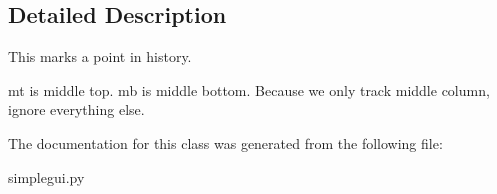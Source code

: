 \subsection{Detailed Description}
This marks a point in history. 

mt is middle top. mb is middle bottom. Because we only track middle column, ignore everything else. 

The documentation for this class was generated from the following file\-:\begin{DoxyCompactItemize}
\item 
simplegui.\-py\end{DoxyCompactItemize}
